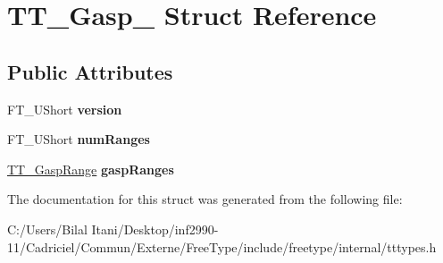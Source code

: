 \hypertarget{struct_t_t___gasp__}{}\section{T\+T\+\_\+\+Gasp\+\_\+ Struct Reference}
\label{struct_t_t___gasp__}
\subsection*{Public Attributes}
\begin{DoxyCompactItemize}
\item 
F\+T\+\_\+\+U\+Short {\bfseries version}\hypertarget{struct_t_t___gasp___a0166777999a11a32068418ed6cf0caf8}{}\label{struct_t_t___gasp___a0166777999a11a32068418ed6cf0caf8}

\item 
F\+T\+\_\+\+U\+Short {\bfseries num\+Ranges}\hypertarget{struct_t_t___gasp___a03f6dc693ebee0fedc055ac0981ee776}{}\label{struct_t_t___gasp___a03f6dc693ebee0fedc055ac0981ee776}

\item 
\hyperlink{struct_t_t___gasp_range_rec__}{T\+T\+\_\+\+Gasp\+Range} {\bfseries gasp\+Ranges}\hypertarget{struct_t_t___gasp___a50240e84cfd7fc79ae1f2996ecb2a5d1}{}\label{struct_t_t___gasp___a50240e84cfd7fc79ae1f2996ecb2a5d1}

\end{DoxyCompactItemize}


The documentation for this struct was generated from the following file\+:\begin{DoxyCompactItemize}
\item 
C\+:/\+Users/\+Bilal Itani/\+Desktop/inf2990-\/11/\+Cadriciel/\+Commun/\+Externe/\+Free\+Type/include/freetype/internal/tttypes.\+h\end{DoxyCompactItemize}
